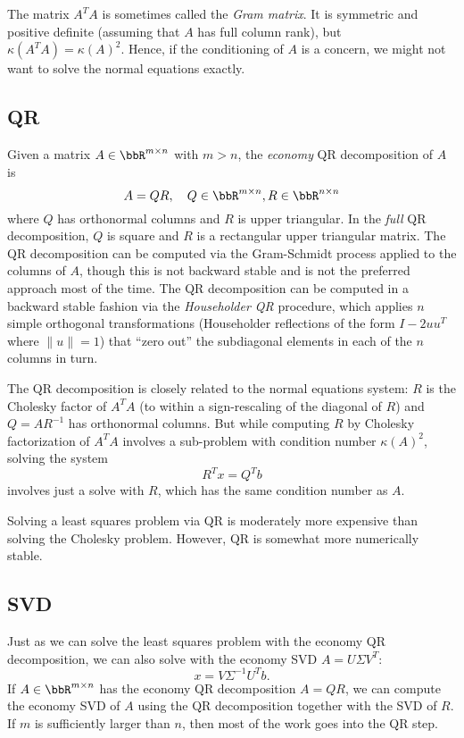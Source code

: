 \documentclass[12pt, leqno]{article}
\begin{document}
The matrix $A^T A$ is sometimes called the {\em Gram matrix}.  It is
symmetric and positive definite (assuming that $A$ has full column
rank), but $\kappa(A^T A) = \kappa(A)^2$.  Hence, if the conditioning
of $A$ is a concern, we might not want to solve the normal equations
exactly.

\subsection{QR}

Given a matrix $A \in \bbR^{m \times n}$ with $m > n$, the {\em economy} QR
decomposition of $A$ is 
\[
  A = QR, \quad Q \in \bbR^{m \times n}, R \in \bbR^{n \times n}
\]
where $Q$ has orthonormal columns and $R$ is upper triangular.  In the
{\em full} QR decomposition, $Q$ is square and $R$ is a rectangular
upper triangular matrix.  The QR decomposition can be computed via the
Gram-Schmidt process applied to the columns of $A$, though this is not
backward stable and is not the preferred approach most of the time.
The QR decomposition can be computed in a backward stable fashion via
the {\em Householder QR} procedure, which applies $n$ simple
orthogonal transformations (Householder reflections of the form
$I-2uu^T$ where $\|u\| = 1$) that ``zero out'' the subdiagonal
elements in each of the $n$ columns in turn.

The QR decomposition is closely related to the normal equations
system: $R$ is the Cholesky factor of $A^T A$ (to within a
sign-rescaling of the diagonal of $R$) and $Q = A R^{-1}$ has
orthonormal columns.  But while computing $R$ by Cholesky
factorization of $A^T A$ involves a sub-problem with condition number
$\kappa(A)^2$, solving the system
\[
  R^T x = Q^T b
\]
involves just a solve with $R$, which has the same condition
number as $A$.

Solving a least squares problem via QR is moderately more expensive
than solving the Cholesky problem.  However, QR is somewhat more
numerically stable.

\subsection{SVD}

Just as we can solve the least squares problem with the economy QR
decomposition, we can also solve with the economy SVD $A = U \Sigma
V^T$:
\[
  x = V \Sigma^{-1} U^T b.
\]
If $A \in \bbR^{m \times n}$ has the economy QR decomposition
$A = QR$, we can compute the economy SVD of $A$ using the QR
decomposition together with the SVD of $R$.  If $m$ is sufficiently
larger than $n$, then most of the work goes into the QR step.
\end{document}
